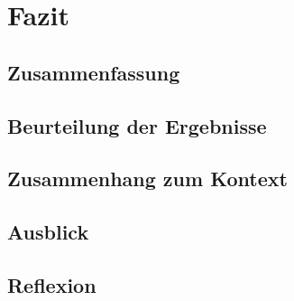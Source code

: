\chapter{Fazit}
\label{chap:conclusions}

\section{Zusammenfassung}

\section{Beurteilung der Ergebnisse}

\section{Zusammenhang zum Kontext}

\section{Ausblick}

\section{Reflexion}


